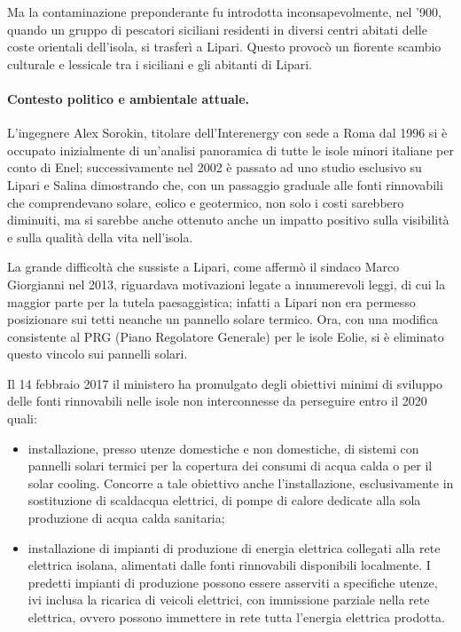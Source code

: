 \documentclass[fleqn,11pt]{SelfArx} %
\begin{document}
Ma la contaminazione preponderante fu introdotta inconsapevolmente, nel '900, quando un gruppo di pescatori siciliani residenti in diversi centri abitati delle coste orientali dell'isola, si trasferì a Lipari. Questo provocò un fiorente scambio culturale e lessicale tra i siciliani e gli abitanti di Lipari.

\paragraph*{Contesto politico e ambientale attuale.}
L'ingegnere Alex Sorokin, titolare dell'Interenergy con sede a Roma dal 1996 si è occupato inizialmente di un'analisi panoramica di tutte le isole minori italiane per conto di Enel; successivamente nel 2002 è passato ad uno studio esclusivo su Lipari e Salina dimostrando che, con un passaggio graduale alle fonti rinnovabili che comprendevano solare, eolico e geotermico, non solo i costi sarebbero diminuiti, ma si sarebbe anche ottenuto anche un impatto positivo sulla visibilità e sulla qualità della vita nell'isola. 

La grande difficoltà che sussiste a Lipari, come affermò il  sindaco Marco Giorgianni nel 2013, riguardava motivazioni legate a innumerevoli leggi, di cui la maggior parte per la tutela paesaggistica; infatti a Lipari non era permesso posizionare sui tetti neanche un pannello solare termico. Ora, con una modifica consistente al PRG (Piano Regolatore Generale) per le isole Eolie, si è eliminato questo vincolo sui pannelli solari.

Il 14 febbraio 2017 il ministero ha promulgato degli obiettivi minimi di sviluppo delle fonti rinnovabili nelle isole non interconnesse da perseguire entro il 2020 quali: 
\begin{itemize}
	\item installazione, presso utenze domestiche e non domestiche, di sistemi con pannelli solari termici per la copertura dei consumi di acqua calda o per il solar cooling. Concorre a tale obiettivo anche l'installazione, esclusivamente in sostituzione di scaldacqua elettrici, di pompe di calore dedicate alla sola produzione di acqua calda sanitaria;
	\item installazione di impianti di produzione di energia elettrica collegati alla rete elettrica isolana, alimentati dalle fonti rinnovabili disponibili localmente. I predetti impianti di produzione possono essere asserviti a specifiche utenze, ivi inclusa la ricarica di veicoli elettrici, con immissione parziale nella rete elettrica, ovvero possono immettere in rete tutta l'energia elettrica prodotta.
\end{itemize}
\end{document}
